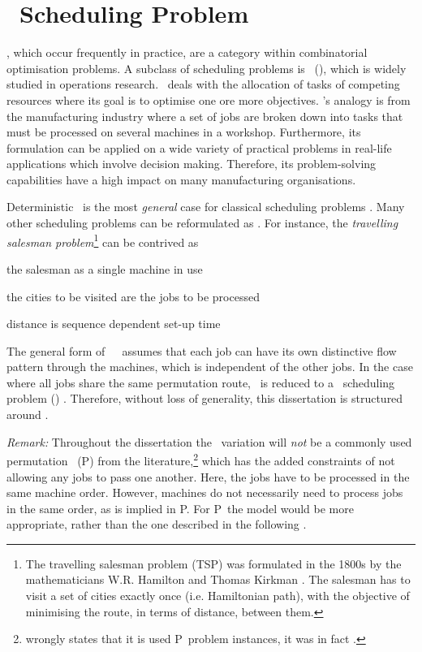 
\chapter{\Jsp\ Scheduling Problem}\label{ch:scheduling}
, which occur frequently in practice, are 
a category within combinatorial optimisation problems. 
A subclass of scheduling problems is \jsp\ (\JSP), which 
is widely studied in operations research. 
\JSP\ deals with the allocation of tasks of competing resources where its goal 
is to optimise one ore more objectives. 
\Jsp's analogy is from the manufacturing industry where a set of jobs are 
broken down into tasks that must be processed on several machines in a 
workshop. 
Furthermore, its formulation can be applied on a wide variety of practical 
problems in real-life applications which involve decision making. Therefore, 
its problem-solving capabilities have a high impact on many manufacturing 
organisations. %

Deterministic \JSP\ is the most \emph{general} case for classical scheduling problems \citep{Jain99}. 
Many other scheduling problems can be reformulated as \JSP. 
For instance, the \textit{travelling salesman problem}\footnote{
    The travelling salesman problem (TSP) was formulated in the 1800s by the 
    mathematicians W.R. Hamilton and Thomas Kirkman \citep{graphtheory}. 
    The salesman has to visit a set of cities exactly once (i.e. Hamiltonian 
    path), with the objective of minimising the route, in terms of distance, 
    between them.}
 can be contrived as \JSP
\begin{enumerate*}[label={{}}]
    \item the salesman as a single machine in use
    \item the cities to be visited are the jobs to be processed
    \item distance is sequence dependent set-up time
\end{enumerate*}
The general form of~~\JSP\ assumes that each job can have its own 
distinctive flow pattern through the machines, which is independent of the 
other jobs. 
In the case where all jobs share the same permutation route, \jsp\ is reduced 
to a \fsp\ scheduling problem (\FSP) \citep{Guinet1998,Tay08}. 
Therefore, without loss of generality, this dissertation is structured around 
\JSP. 

\emph{Remark:} Throughout the dissertation the \FSP\ variation will \emph{not} 
be a commonly used permutation \fsp\ (P\FSP) from the 
literature,\footnote{ wrongly states that it is used P\FSP\ problem
    instances, it was in fact \FSP.} 
which has the added constraints of not allowing any jobs to pass one another.
Here, the jobs have to be processed in the same machine order. However, 
machines do not necessarily need to process jobs in the same order, as is 
implied in P\FSP. For P\FSP\ the \citet{Manne60} model would be more 
appropriate, rather than the one described in the following 
.

